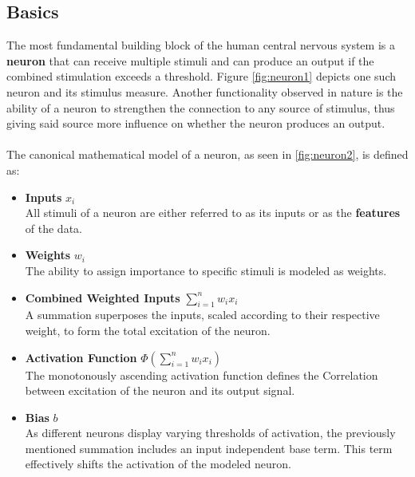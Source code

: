 \subsection{Basics}
The most fundamental building block of the human central nervous system is a \textbf{neuron} that can receive multiple stimuli and can produce an output if the combined stimulation exceeds a threshold. Figure \ref{fig:neuron1} depicts one such neuron and its stimulus measure. Another functionality observed in nature is the ability of a neuron to strengthen the connection to any source of stimulus, thus giving said source more influence on whether the neuron produces an output.\cite{Biology_Background}\\
\\
The canonical mathematical model of a neuron, as seen in \ref{fig:neuron2}, is defined as:
\begin{itemize}
	\item \textbf{Inputs} $x_i$\\
	All stimuli of a neuron are either referred to as its inputs or as the \textbf{features} of the data.\\
	\item \textbf{Weights} $w_i$\\
	The ability to assign importance to specific stimuli is modeled as weights.\\
	\item \textbf{Combined Weighted Inputs} $\sum_{i=1}^{n}w_i x_i$\\
	A summation superposes the inputs, scaled according to their respective weight, to form the total excitation of the neuron.\\
	\item \textbf{Activation Function} $\Phi(\sum_{i=1}^{n}w_i x_i)$\\
	The monotonously ascending activation function defines the Correlation between excitation of the neuron and its output signal.\\
	\item \textbf{Bias} $b$\\  
	As different neurons display varying thresholds of activation, the previously mentioned summation includes an input independent base term. This term effectively shifts the activation of the modeled neuron.\\
\end{itemize}

